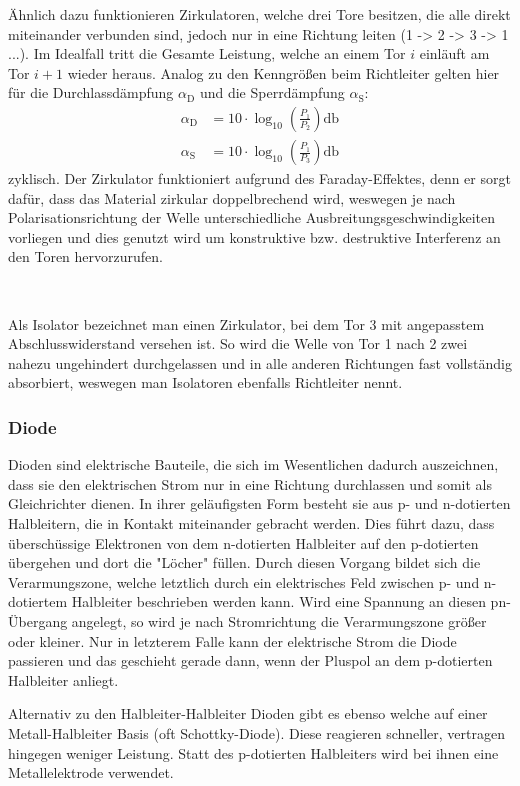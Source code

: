 	Ähnlich dazu funktionieren Zirkulatoren, welche drei Tore besitzen, die alle direkt miteinander verbunden sind, jedoch nur in eine Richtung leiten (1 -> 2 -> 3 -> 1 ...).
	Im Idealfall tritt die Gesamte Leistung, welche an einem Tor $i$ einläuft am Tor $i+1$ wieder heraus.
	Analog zu den Kenngrößen beim Richtleiter gelten hier für die Durchlassdämpfung $\alpha_\text{D}$ und die Sperrdämpfung $\alpha_\text{S}$:
	\begin{align}
		\alpha_\text{D} &=  10 \cdot \log_{10}\left(\frac{P_1}{P_2}\right)\si{\decibel} \\
		\alpha_\text{S} &=  10 \cdot \log_{10}\left(\frac{P_1}{P_3}\right)\si{\decibel} 
	\end{align}
	zyklisch.
	Der Zirkulator funktioniert aufgrund des Faraday-Effektes, denn er sorgt dafür, dass das Material zirkular doppelbrechend wird, weswegen je nach Polarisationsrichtung der Welle unterschiedliche Ausbreitungsgeschwindigkeiten vorliegen und dies genutzt wird um konstruktive bzw. destruktive Interferenz an den Toren hervorzurufen.
	
	\
	
	Als Isolator bezeichnet man einen Zirkulator, bei dem Tor 3 mit angepasstem Abschlusswiderstand versehen ist.
	So wird die Welle von Tor 1 nach 2 zwei nahezu ungehindert durchgelassen und in alle anderen Richtungen fast vollständig absorbiert, weswegen man Isolatoren ebenfalls Richtleiter nennt.
	 
\subsubsection*{Diode}

	Dioden sind elektrische Bauteile, die sich im Wesentlichen dadurch auszeichnen, dass sie den elektrischen Strom nur in eine Richtung durchlassen und somit als Gleichrichter dienen.
	In ihrer geläufigsten Form besteht sie aus p- und n-dotierten Halbleitern, die in Kontakt miteinander gebracht werden.
	Dies führt dazu, dass überschüssige Elektronen von dem n-dotierten Halbleiter auf den p-dotierten übergehen und dort die "Löcher" füllen.
	Durch diesen Vorgang bildet sich die Verarmungszone, welche letztlich durch ein elektrisches Feld zwischen p- und n-dotiertem Halbleiter beschrieben werden kann.
	Wird eine Spannung an diesen pn-Übergang angelegt, so wird je nach Stromrichtung die Verarmungszone größer oder kleiner.
	Nur in letzterem Falle kann der elektrische Strom die Diode passieren und das geschieht gerade dann, wenn der Pluspol an dem p-dotierten Halbleiter anliegt.
	
	Alternativ zu den Halbleiter-Halbleiter Dioden gibt es ebenso welche auf einer Metall-Halbleiter Basis (oft Schottky-Diode).
	Diese reagieren schneller, vertragen hingegen weniger Leistung.
	Statt des p-dotierten Halbleiters wird bei ihnen eine Metallelektrode verwendet.
